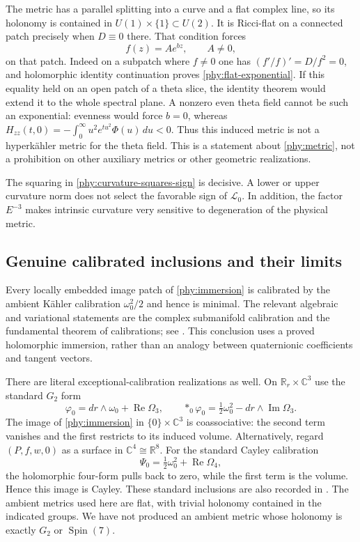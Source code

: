 \documentclass[11pt]{article}
\numberwithin{equation}{section}
\theoremstyle{definition}
\theoremstyle{remark}
\begin{document}
The metric has a parallel splitting into a curve and a flat complex line,
so its holonomy is contained in $U(1)\times\{1\}\subset U(2)$.
It is Ricci-flat on a connected patch precisely when $D\equiv0$ there.
That condition forces
\begin{equation}
 f(z)=A e^{bz},\qquad A\ne0,
 \label{phy:flat-exponential}
\end{equation}
on that patch.  Indeed on a subpatch where $f\ne0$ one has
$(f'/f)'=D/f^2=0$, and holomorphic identity continuation proves
\eqref{phy:flat-exponential}.  If this equality held on an open patch of a theta slice, the identity
theorem would extend it to the whole spectral plane.  A nonzero even theta
field cannot be such an exponential: evenness would force $b=0$, whereas
$H_{zz}(t,0)=-\int_0^\infty u^2e^{tu^2}\Phi(u)\,du<0$.
Thus this induced metric is not a hyperkähler metric for the theta field.
This is a statement about \eqref{phy:metric}, not a prohibition on other
auxiliary metrics or other geometric realizations.

The squaring in \eqref{phy:curvature-squares-sign} is decisive.  A lower or
upper curvature norm does not select the favorable sign of
$\mathcal L_0$.  In addition, the factor $E^{-3}$ makes intrinsic curvature
very sensitive to degeneration of the physical metric.

\subsection{Genuine calibrated inclusions and their limits}

Every locally embedded image patch of \eqref{phy:immersion} is calibrated
by the ambient Kähler calibration $\omega_0^2/2$ and hence is minimal.
The relevant algebraic and variational statements are the complex
submanifold calibration and the fundamental theorem of calibrations;
see \cite[Theorems 3.1 and 2.3]{Lotay2018}.  This conclusion uses a proved
holomorphic immersion, rather than an analogy between quaternionic
coefficients and tangent vectors.

There are literal exceptional-calibration realizations as well.  On
$\mathbb R_r\times\mathbb C^3$ use the standard $G_2$ form
\[
 \varphi_0=dr\wedge\omega_0+\operatorname{Re}\Omega_3,
 \qquad *_0\varphi_0=\tfrac12\omega_0^2-dr\wedge\operatorname{Im}\Omega_3.
\]
The image of \eqref{phy:immersion} in $\{0\}\times\mathbb C^3$ is
coassociative: the second term vanishes and the first restricts to its
induced volume.  Alternatively, regard $(P,f,w,0)$ as a surface in
$\mathbb C^4\cong\mathbb R^8$.  For the standard Cayley calibration
\begin{equation}
 \Psi_0=\tfrac12\omega_0^2+\operatorname{Re}\Omega_4,
 \label{phy:cayley-calibration}
\end{equation}
the holomorphic four-form pulls back to zero, while the first term is the
volume.  Hence this image is Cayley.  These standard inclusions are also
recorded in \cite[Propositions 6.5 and 7.3]{Lotay2018}.
The ambient metrics used here are flat, with trivial holonomy contained
in the indicated groups.  We have not produced an ambient metric whose
holonomy is exactly $G_2$ or $\operatorname{Spin}(7)$.
\end{document}
